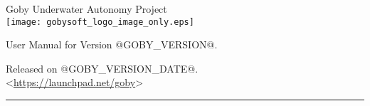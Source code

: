 \documentclass[11pt, letterpaper, oneside]{memoir}
\begin{document}
\begin{center}
\begin{Large}
Goby Underwater Autonomy Project\\
\vspace{0.5em}
\texttt{[image: gobysoft\_logo\_image\_only.eps]} \\
\vspace{0.5em}
\end{Large}
\begin{LARGE}
User Manual for Version @GOBY_VERSION@.\\
\vspace{0.5em}
\end{LARGE}
Released on @GOBY_VERSION_DATE@.\\
<\url{https://launchpad.net/goby}>



\end{center}
\vspace{0.5em}
\rule{\textwidth}{1pt}

\vspace{0.5em}

\tableofcontents

{}
\bvnumbersoutside
\linenumberfont{\normalfont\tiny}
\setsecheadstyle{\Large\raggedright}
\setsubsecheadstyle{\large\raggedright}
\setsubsubsecheadstyle{\itshape\raggedright}
\setparaheadstyle{\itshape\raggedright}
\setsubparaheadstyle{\itshape\raggedright}

\hangsecnum








\printglossaries



\end{document}
